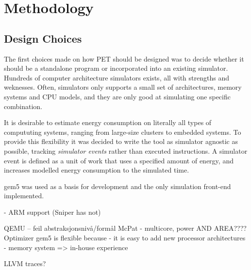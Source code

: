 \section{Methodology}

\subsection{Design Choices}
\label{subsec:design_choises}
The first choices made on how PET should be designed was to decide whether it
should be a standalone program or incorporated into an existing simulator.
Hundreds of computer architecture simulators exists, all with strengths and
weknesses. Often, simulators only supports a small set of architectures, memory
systems and CPU models, and they are only good at simulating one specific
combination.

It is desirable to estimate energy consumption on literally all types of
compututing systems, ranging from large-size clusters to embedded systems. To
provide this flexibility it was decided to write the tool as simulator agnostic
as possible, tracking \emph{simulator events} rather than executed instructions.
A simulator event is defined as a unit of work that uses a specified amount of
energy, and increases modelled energy consumption to the simulated time.


gem5 was used as a basis for development and the only simulation front-end
implemented.




- ARM support (Sniper has not)

QEMU -- feil abstraksjonsnivå/formål
McPat - multicore, power AND AREA???? Optimizer
gem5 is flexible because
    - it is easy to add new processor architectures
    - memory system
=> in-house experience

LLVM traces?

